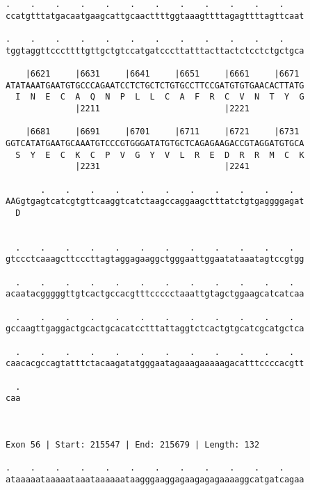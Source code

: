 \documentclass{article}
\begin{document}
\begin{Verbatim}
.    .    .    .    .    .    .    .    .    .    .    .    
ccatgtttatgacaatgaagcattgcaacttttggtaaagttttagagttttagttcaat
                                                            
.    .    .    .    .    .    .    .    .    .    .    .    
tggtaggttcccttttgttgctgtccatgatcccttatttacttactctcctctgctgca
                                                            
    |6621     |6631     |6641     |6651     |6661     |6671 
ATATAAATGAATGTGCCCAGAATCCTCTGCTCTGTGCCTTCCGATGTGTGAACACTTATG
  I  N  E  C  A  Q  N  P  L  L  C  A  F  R  C  V  N  T  Y  G
              |2211                         |2221           
  
    |6681     |6691     |6701     |6711     |6721     |6731 
GGTCATATGAATGCAAATGTCCCGTGGGATATGTGCTCAGAGAAGACCGTAGGATGTGCA
  S  Y  E  C  K  C  P  V  G  Y  V  L  R  E  D  R  R  M  C  K
              |2231                         |2241           
  
       .    .    .    .    .    .    .    .    .    .    .  
AAGgtgagtcatcgtgttcaaggtcatctaagccaggaagctttatctgtgaggggagat
  D                                                         
                                                            
  
  .    .    .    .    .    .    .    .    .    .    .    .  
gtccctcaaagcttcccttagtaggagaaggctgggaattggaatataaatagtccgtgg
                                                            
  .    .    .    .    .    .    .    .    .    .    .    .  
acaatacgggggttgtcactgccacgtttccccctaaattgtagctggaagcatcatcaa
                                                            
  .    .    .    .    .    .    .    .    .    .    .    .  
gccaagttgaggactgcactgcacatcctttattaggtctcactgtgcatcgcatgctca
                                                            
  .    .    .    .    .    .    .    .    .    .    .    .  
caacacgccagtatttctacaagatatgggaatagaaagaaaaagacatttccccacgtt
                                                            
  .
caa
   
   
 
Exon 56 | Start: 215547 | End: 215679 | Length: 132
 
.    .    .    .    .    .    .    .    .    .    .    .    
ataaaaataaaaataaataaaaaataagggaaggagaagagagaaaaggcatgatcagaa
                                                            

\end{Verbatim}
\end{document}
